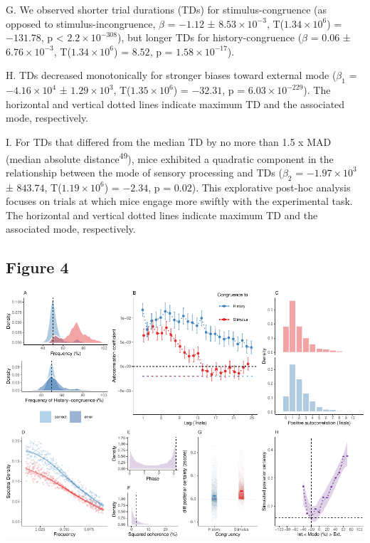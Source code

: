 \documentclass[
]{article}
\begin{document}
G. We observed shorter trial durations (TDs) for stimulus-congruence (as
opposed to stimulus-incongruence, \(\beta\) = \(-1.12\) ±
\(\ensuremath{8.53\times 10^{-3}}\),
T(\(\ensuremath{1.34\times 10^{6}}\)) = \(-131.78\), p < \(\ensuremath{2.2\times 10^{-308}}\)), but
longer TDs for history-congruence (\(\beta\) = \(0.06\) ±
\(\ensuremath{6.76\times 10^{-3}}\),
T(\(\ensuremath{1.34\times 10^{6}}\)) = \(8.52\), p =
\(\ensuremath{1.58\times 10^{-17}}\)).

H. TDs decreased monotonically for stronger biases toward external mode
(\(\beta_1\) = \(\ensuremath{-4.16\times 10^{4}}\) ±
\(\ensuremath{1.29\times 10^{3}}\),
T(\(\ensuremath{1.35\times 10^{6}}\)) = \(-32.31\), p =
\(\ensuremath{6.03\times 10^{-229}}\)). The horizontal and vertical
dotted lines indicate maximum TD and the associated mode, respectively.

I. For TDs that differed from the median TD by no more than 1.5 x MAD
(median absolute distance\textsuperscript{49}), mice exhibited a
quadratic component in the relationship between the mode of sensory
processing and TDs (\(\beta_2\) = \(\ensuremath{-1.97\times 10^{3}}\) ±
\(843.74\), T(\(\ensuremath{1.19\times 10^{6}}\)) = \(-2.34\), p =
\(0.02\)). This explorative post-hoc analysis focuses on trials at which
mice engage more swiftly with the experimental task. The horizontal and
vertical dotted lines indicate maximum TD and the associated mode,
respectively.

\newpage

\hypertarget{figure-4}{%
\subsection{Figure 4}\label{figure-4}}

\includegraphics{modes_mouse_rev1b_clean_files/figure-latex/Figure_4-1.pdf}
\end{document}

